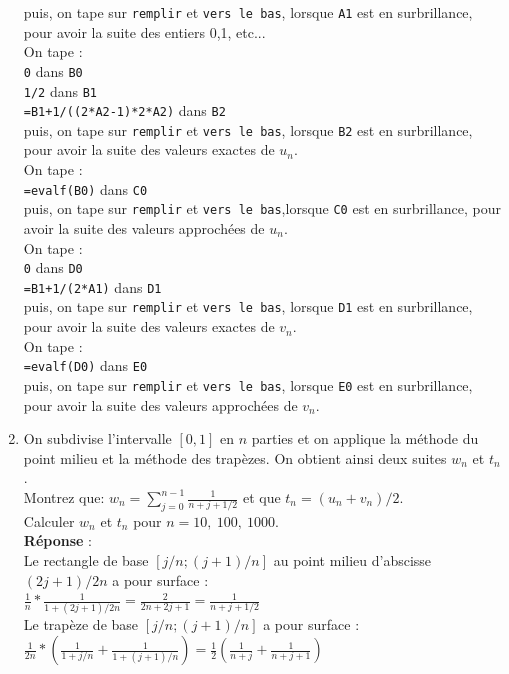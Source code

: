 \documentclass[a4paper,11pt]{book}
\begin{document}
\begin{enumerate}
puis, on tape sur {\tt remplir} et {\tt vers le bas}, lorsque {\tt A1} est en surbrillance,
pour avoir la suite des entiers 0,1, etc...\\
On tape :\\
{\tt 0} dans {\tt B0}\\ 
{\tt 1/2} dans {\tt B1} \\
{\tt =B1+1/((2*A2-1)*2*A2)} dans {\tt B2}\\
puis, on tape sur {\tt remplir} et {\tt vers le bas}, lorsque {\tt B2} est en surbrillance,
pour avoir la suite des valeurs exactes de $u_n$.\\
On tape :\\
{\tt =evalf(B0)} dans {\tt C0} \\ 
puis, on tape sur {\tt remplir}  et {\tt vers le bas},lorsque {\tt C0} est en surbrillance,
pour avoir la suite des valeurs approch\'ees de $u_n$.\\
On tape :\\
{\tt 0} dans {\tt D0} \\ 
{\tt =B1+1/(2*A1)} dans {\tt D1}\\
puis, on tape sur {\tt remplir}  et {\tt vers le bas}, lorsque {\tt D1} est en surbrillance,
pour avoir la suite des valeurs exactes de $v_n$.\\
On tape :\\
{\tt =evalf(D0)} dans {\tt E0}\\ 
puis, on tape sur {\tt remplir} et {\tt vers le bas}, lorsque {\tt E0} est en surbrillance,
pour avoir la suite des valeurs approch\'ees de $v_n$.

\item On subdivise l'intervalle $[0,1]$ en $n$ parties et on
applique la m\'ethode du point milieu et la m\'ethode des trap\`ezes.
 On obtient ainsi deux suites $w_n$ et $t_n$.\\
Montrez que:
$w_n= \sum _{j=0}^{n-1} \frac{1}{n+j+1/2}$
et que $t_n=(u_n+v_n)/2$.\\
Calculer  $w_n$ et $t_n$ pour $ n=10,\ 100,\ 1000$.\\
{\bf R\'eponse} :\\
Le rectangle de base $[j/n;(j+1)/n]$ au point milieu d'abscisse $(2j+1)/2n$ 
a pour surface :\\
 $\frac{1}{n}*\frac{1}{1+(2j+1)/2n}=\frac{2}{2n+2j+1}=\frac{1}{n+j+1/2}$\\
Le trap\`eze de base $[j/n;(j+1)/n]$ a pour surface :\\
 $\frac{1}{2n}*(\frac{1}{1+j/n}+\frac{1}{1+(j+1)/n})=\frac{1}{2}(\frac{1}{n+j}+\frac{1}{n+j+1})$\\


\end{enumerate}
\end{document}
